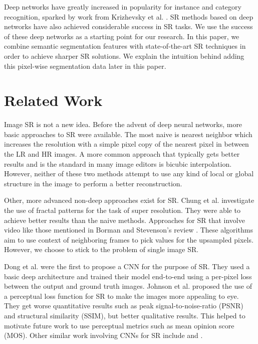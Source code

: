 \documentclass[10pt,twocolumn,letterpaper]{article}
\begin{document}
Deep networks have greatly increased in popularity for instance and category
recognition, sparked by work from Krizhevsky et al. \cite{AlexNet}. SR methods
based on deep networks have also achieved considerable success in SR tasks. We
use the success of these deep networks as a starting point for our research. In
this paper, we combine semantic segmentation features with state-of-the-art SR
techniques in order to achieve sharper SR solutions. We explain the intuition
behind adding this pixel-wise segmentation data later in this paper.


\section{Related Work}
Image SR is not a new idea. Before the advent of deep neural networks, more
basic approaches to SR were available. The most naive is nearest neighbor which
increases the resolution with a simple pixel copy of the nearest pixel in
between the LR and HR images. A more common approach that typically gets better
results and is the standard in many image editors is bicubic interpolation.
However, neither of these two methods attempt to use any kind of local or
global structure in the image to perform a better reconstruction.

Other, more advanced non-deep approaches exist for SR. Chung et al.
\cite{FractalSR} investigate the use of fractal patterns for the task of super
resolution. They were able to achieve better results than the naive methods.
Approaches for SR that involve video like those mentioned in Borman and
Stevenson's review \cite{VideoSR}. These algorithms aim to use context of
neighboring frames to pick values for the upsampled pixels. However, we choose
to stick to the problem of single image SR.

Dong et al. \cite{SRCNN} were the first to propose a CNN for the purpose of SR.
They used a basic deep architecture and trained their model end-to-end using a
per-pixel loss between the output and ground truth images. Johnson et al.
\cite{PerceptualLosses} proposed the use of a perceptual loss function for SR
to make the images more appealing to eye. They get worse quantitative results
such as peak signal-to-noise-ratio (PSNR) and structural similarity (SSIM), but
better qualitative results. This helped to motivate future work to use
perceptual metrics such as mean opinion score (MOS). Other similar work
involving CNNs for SR include \cite{RealtimeCNN} and \cite{DeeplyRecursive}.
\end{document}
